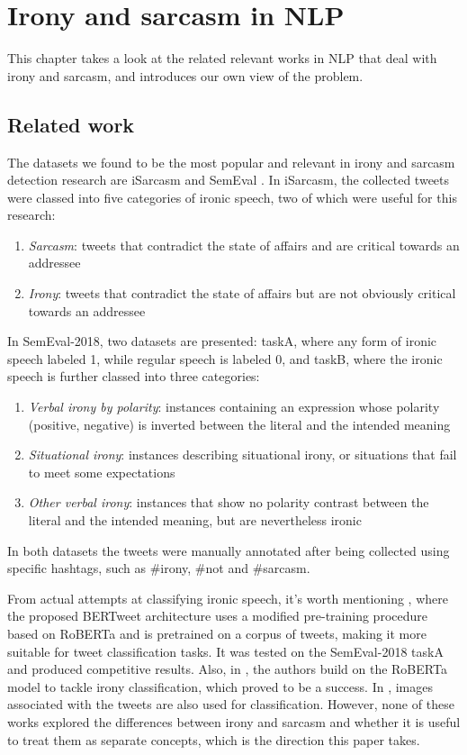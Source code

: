\documentclass[10pt, a4paper]{article}
\begin{document}
\section{Irony and sarcasm in NLP}
This chapter takes a look at the related relevant works in NLP that deal with irony and sarcasm, and introduces our own view 
of the problem.
\subsection{Related work}
The datasets we found to be the most popular and relevant in irony and sarcasm detection research are iSarcasm \citep{iSarcasm} 
and SemEval \citep{semeval-2018}. In iSarcasm, the collected tweets were classed into five categories of ironic speech, two of
which were useful for this research:
\begin{enumerate}
   \item \textit{Sarcasm}: tweets that contradict the state of affairs and are critical towards an addressee
   \item \textit{Irony}:  tweets that contradict the state of affairs but are not obviously critical towards an addressee
 \end{enumerate}
In SemEval-2018,
two datasets are presented: taskA, where any form of ironic speech labeled 1, while regular speech is labeled 
0, and taskB, where the ironic speech is further classed into three categories:
\begin{enumerate}
   \item \textit{Verbal irony by polarity}:
   instances containing an
   expression whose polarity (positive,
   negative) is inverted between the literal and the intended meaning
   \item \textit{Situational irony}:  instances describing situational irony, or situations
   that fail to meet some expectations
   \item \textit{Other verbal irony}: instances that show no polarity contrast between the 
   literal and the intended meaning, but are nevertheless ironic
 \end{enumerate}
 In both datasets the tweets were manually annotated after being collected using specific hashtags, such 
 as \#irony, \#not and \#sarcasm.

From actual attempts at classifying 
ironic speech, it's worth mentioning \citep{bertweet}, where the proposed BERTweet architecture uses a modified pre-training procedure based 
on RoBERTa \citep{roberta} and is pretrained on a corpus of tweets, 
making it more suitable for tweet classification tasks. It was tested on the SemEval-2018 taskA and produced competitive results. Also, in \citep{transformers4irony-2020}, the authors build on the 
RoBERTa model to tackle 
irony classification, which proved to be a success. In \citep{transformers4irony-2023}, images associated with the tweets are also used 
for classification. However, none of these works explored the differences between irony and sarcasm and whether it 
is useful to treat them as separate concepts, which is the direction this paper takes.
 
\end{document}

